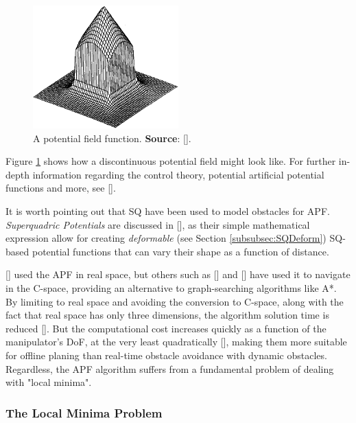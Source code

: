 \begin{figure}[h]
	\centering
	\includegraphics[width=0.5\textwidth]{import/APF_Obstacle.png}
	\caption{A potential field function. \textbf{Source}: [\citeauthor{Warren1989}].}
	\label{fig:APF_PotField}
\end{figure}

Figure \ref{fig:APF_PotField} shows how a discontinuous potential field might look like. For further in-depth information regarding the control theory, potential artificial potential functions and more, see [\citeauthor{Khatib}].

It is worth pointing out that \gls{SQ} have been used to model obstacles for \gls{APF}. \textit{Superquadric Potentials} are discussed in [\citeauthor{Volpe1990}], as their simple mathematical expression allow for creating \textit{deformable} (see Section \ref{subsubsec:SQDeform}) \gls{SQ}-based potential functions that can vary their shape as a function of distance.

[\citeauthor{Khatib}] used the \gls{APF} in real space, but others such as [\citeauthor{Warren1989}] and [\citeauthor{Volpe1990}] have used it to navigate in the C-space, providing an alternative to graph-searching algorithms like A*. By limiting to real space and avoiding the conversion to C-space, along with the fact that real space has only three dimensions, the algorithm solution time is reduced [\citeauthor{Warren1989}]. But the computational cost increases quickly as a function of the manipulator's \gls{DoF}, at the very least quadratically [\citeauthor{Volpe1990}], making them more suitable for offline planing than real-time obstacle avoidance with dynamic obstacles. Regardless, the \gls{APF} algorithm suffers from a fundamental problem of dealing with "local minima".

\subsubsection{The Local Minima Problem} \label{subsubsec:localminima}

